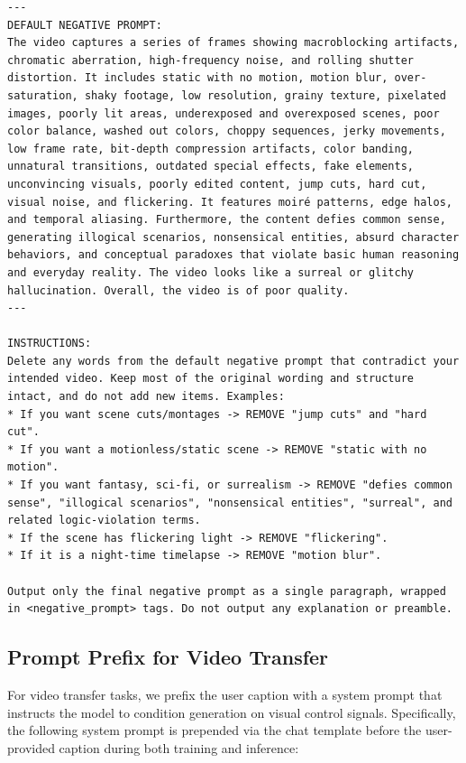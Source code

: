 \begin{tcolorbox}
\begin{Verbatim}[breaklines=true,breakanywhere=true,fontsize=\scriptsize]
---
DEFAULT NEGATIVE PROMPT:
The video captures a series of frames showing macroblocking artifacts, chromatic aberration, high-frequency noise, and rolling shutter distortion. It includes static with no motion, motion blur, over-saturation, shaky footage, low resolution, grainy texture, pixelated images, poorly lit areas, underexposed and overexposed scenes, poor color balance, washed out colors, choppy sequences, jerky movements, low frame rate, bit-depth compression artifacts, color banding, unnatural transitions, outdated special effects, fake elements, unconvincing visuals, poorly edited content, jump cuts, hard cut, visual noise, and flickering. It features moiré patterns, edge halos, and temporal aliasing. Furthermore, the content defies common sense, generating illogical scenarios, nonsensical entities, absurd character behaviors, and conceptual paradoxes that violate basic human reasoning and everyday reality. The video looks like a surreal or glitchy hallucination. Overall, the video is of poor quality.
---

INSTRUCTIONS:
Delete any words from the default negative prompt that contradict your intended video. Keep most of the original wording and structure intact, and do not add new items. Examples:
* If you want scene cuts/montages -> REMOVE "jump cuts" and "hard cut".
* If you want a motionless/static scene -> REMOVE "static with no motion".
* If you want fantasy, sci-fi, or surrealism -> REMOVE "defies common sense", "illogical scenarios", "nonsensical entities", "surreal", and related logic-violation terms.
* If the scene has flickering light -> REMOVE "flickering".
* If it is a night-time timelapse -> REMOVE "motion blur".

Output only the final negative prompt as a single paragraph, wrapped in <negative_prompt> tags. Do not output any explanation or preamble.
\end{Verbatim}
\end{tcolorbox}

\subsection{Prompt Prefix for Video Transfer}
\label{appendix:generator_transfer_prompt_prefix}
For video transfer tasks, we prefix the user caption with a system prompt that instructs the model to condition generation on visual control signals. Specifically, the following system prompt is prepended via the chat template before the user-provided caption during both training and inference:

